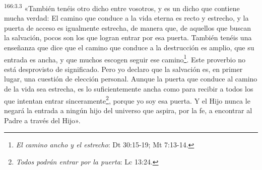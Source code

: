 \par 
\textsuperscript{166:3.3} «También tenéis otro dicho entre vosotros, y es un dicho que contiene mucha verdad: El camino que conduce a la vida eterna es recto y estrecho, y la puerta de acceso es igualmente estrecha, de manera que, de aquellos que buscan la salvación, pocos son los que logran entrar por esa puerta. También tenéis una enseñanza que dice que el camino que conduce a la destrucción es amplio, que su entrada es ancha, y que muchos escogen seguir ese camino\footnote{\textit{El camino ancho y el estrecho}: Dt 30:15-19; Mt 7:13-14.}. Este proverbio no está desprovisto de significado. Pero yo declaro que la salvación es, en primer lugar, una cuestión de elección personal. Aunque la puerta que conduce al camino de la vida sea estrecha, es lo suficientemente ancha como para recibir a todos los que intentan entrar sinceramente\footnote{\textit{Todos podrán entrar por la puerta}: Lc 13:24.}, porque yo soy esa puerta. Y el Hijo nunca le negará la entrada a ningún hijo del universo que aspira, por la fe, a encontrar al Padre a través del Hijo».

